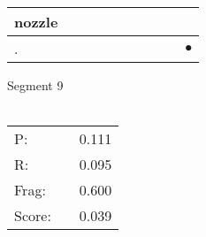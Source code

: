 \documentclass[landscape]{article}
\newcommand{\ssp}{\hspace{2pt}}
\newcommand{\mex}{\cellcolor{g}$\bullet$}
\begin{document}
\begin{tabular}{|l|p{10pt}|p{10pt}|p{10pt}|p{10pt}|p{10pt}|p{10pt}|p{10pt}|p{10pt}|p{10pt}|}
\hline
\ssp nozzle \ssp&\hspace{2pt}&\hspace{2pt}&\hspace{2pt}&\hspace{2pt}&\hspace{2pt}&\hspace{2pt}&\hspace{2pt}&\hspace{2pt}&\hspace{2pt}\\
\hline
\ssp \cellcolor{ref8}. \ssp&\hspace{2pt}&\hspace{2pt}&\hspace{2pt}&\hspace{2pt}&\hspace{2pt}&\hspace{2pt}&\hspace{2pt}&\hspace{2pt}&\hspace{2pt}\mex\\
\hline
\end{tabular}

\vspace{6pt}
\noindent Segment 9\\\\
\noindent\begin{tabular}{lm{12pt}r}
\hline
P:&&0.111\\
R:&&0.095\\
Frag:&&0.600\\
Score:&&0.039\\
\end{tabular}

\newpage
\end{document}
